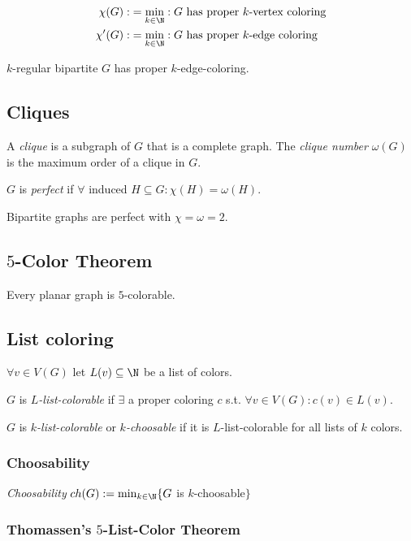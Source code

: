 \vspace*{-4mm}
\begin{align*}
\chi(G) :&= \min_{k \in \N} : G \text{ has proper $k$-vertex coloring} \\
\chi'(G) :&= \min_{k \in \N} : G \text{ has proper $k$-edge coloring}
\end{align*}

$k$-regular bipartite $G$ has proper $k$-edge-coloring.

\subsection*{Cliques}

A \emph{clique} is a subgraph of $G$ that is a complete graph.
The \emph{clique number} $\omega(G)$ is the maximum order of a clique in $G$.

\spacing

$G$ is \emph{perfect} if $\forall$ induced $H \subseteq G : \chi(H) = \omega(H)$.

Bipartite graphs are perfect with $\chi = \omega = 2$.

\subsection*{$5$-Color Theorem}

Every planar graph is $5$-colorable.

\subsection*{List coloring}

$\forall v \in V(G)$ let $L(v) \subseteq \N$ be a list of colors.

$G$ is \emph{$L$-list-colorable} if $\exists$ a proper coloring $c$ s.t. $\forall v \in V(G) : c(v) \in L(v)$.

\spacing

$G$ is \emph{$k$-list-colorable} or \emph{$k$-choosable} if it is $L$-list-colorable for all lists of $k$ colors.

\subsubsection*{Choosability}

\emph{Choosability} $ch(G) := \min_{k\in\N}\{ G$ is $k$-choosable$\}$

\subsubsection*{Thomassen's $5$-List-Color Theorem}

